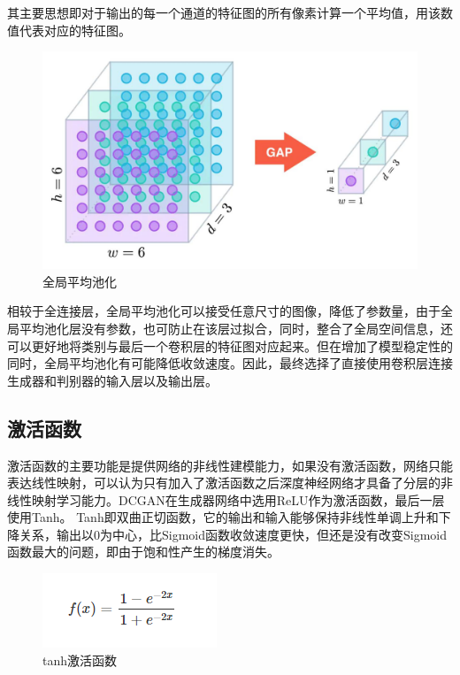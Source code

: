 \documentclass[
  hyperref, a4paper]{ctexart}
\begin{document}
其主要思想即对于输出的每一个通道的特征图的所有像素计算一个平均值，用该数值代表对应的特征图。

\begin{figure}
\centering
\includegraphics{./11.jpg}
\caption{全局平均池化}
\end{figure}

相较于全连接层，全局平均池化可以接受任意尺寸的图像，降低了参数量，由于全局平均池化层没有参数，也可防止在该层过拟合，同时，整合了全局空间信息，还可以更好地将类别与最后一个卷积层的特征图对应起来。但在增加了模型稳定性的同时，全局平均池化有可能降低收敛速度。因此，最终选择了直接使用卷积层连接生成器和判别器的输入层以及输出层。

\hypertarget{ux6fc0ux6d3bux51fdux6570}{%
\subsection{激活函数}\label{ux6fc0ux6d3bux51fdux6570}}

激活函数的主要功能是提供网络的非线性建模能力，如果没有激活函数，网络只能表达线性映射，可以认为只有加入了激活函数之后深度神经网络才具备了分层的非线性映射学习能力。DCGAN在生成器网络中选用ReLU作为激活函数，最后一层使用Tanh。
Tanh即双曲正切函数，它的输出和输入能够保持非线性单调上升和下降关系，输出以0为中心，比Sigmoid函数收敛速度更快，但还是没有改变Sigmoid函数最大的问题，即由于饱和性产生的梯度消失。

\begin{figure}
\centering
\includegraphics{./12.png}
\caption{tanh激活函数}
\end{figure}
\end{document}
